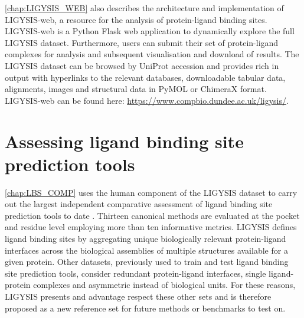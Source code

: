 \autoref{chap:LIGYSIS_WEB} also describes the architecture and implementation of LIGYSIS-web, a resource for the analysis of protein-ligand binding sites. LIGYSIS-web is a Python Flask web application to dynamically explore the full LIGYSIS dataset. Furthermore, users can submit their set of protein-ligand complexes for analysis and subsequent visualisation and download of results. The LIGYSIS dataset can be browsed by UniProt accession and provides rich in output with hyperlinks to the relevant databases, downloadable tabular data, alignments, images and structural data in PyMOL or ChimeraX format. LIGYSIS-web can be found here: \url{https://www.compbio.dundee.ac.uk/ligysis/}.


\section{Assessing ligand binding site prediction tools}

\autoref{chap:LBS_COMP} uses the human component of the LIGYSIS dataset to carry out the largest independent comparative assessment of ligand binding site prediction tools to date \cite{UTGES_2024_LBSCOMP}. Thirteen canonical methods are evaluated at the pocket and residue level employing more than ten informative metrics. LIGYSIS defines ligand binding sites by aggregating unique biologically relevant protein-ligand interfaces across the biological assemblies of multiple structures available for a given protein. Other datasets, previously used to train and test ligand binding site prediction tools, consider redundant protein-ligand interfaces, single ligand-protein complexes and asymmetric instead of biological units. For these reasons, LIGYSIS presents and advantage respect these other sets and is therefore proposed as a new reference set for future methods or benchmarks to test on.

